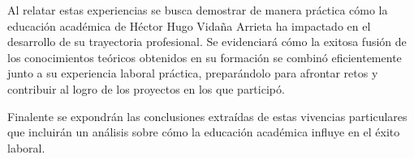 \documentclass[final, fmstyle, 12pt]{article}
\begin{document}
Al relatar estas experiencias se busca demostrar de manera práctica cómo la educación académica de Héctor Hugo Vidaña Arrieta ha impactado en el desarrollo de su trayectoria profesional. Se evidenciará cómo la exitosa fusión de los conocimientos teóricos obtenidos en su formación se combinó eficientemente junto a su experiencia laboral práctica, preparándolo para afrontar retos y contribuir al logro de los proyectos en los que participó. 

Finalente se expondrán las conclusiones extraídas de estas vivencias particulares que incluirán un análisis sobre cómo la educación académica influye en el éxito laboral.



\newpage 


\newpage 


\newpage 

\newpage 

\end{document}
